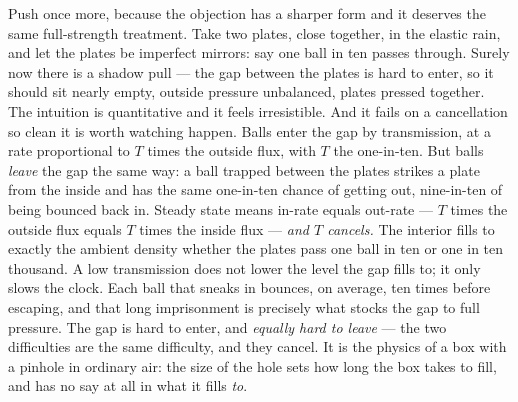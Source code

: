 \documentclass[fontsize=11pt,paper=a4,pagesize=auto,parskip=half-]{scrbook}
\begin{document}
Push once more, because the objection has a sharper form and it deserves the same full-strength treatment. Take two plates, close together, in the elastic rain, and let the plates be imperfect mirrors: say one ball in ten passes through. Surely now there is a shadow pull --- the gap between the plates is hard to enter, so it should sit nearly empty, outside pressure unbalanced, plates pressed together. The intuition is quantitative and it feels irresistible. And it fails on a cancellation so clean it is worth watching happen. Balls enter the gap by transmission, at a rate proportional to $T$ times the outside flux, with $T$ the one-in-ten. But balls \emph{leave} the gap the same way: a ball trapped between the plates strikes a plate from the inside and has the same one-in-ten chance of getting out, nine-in-ten of being bounced back in. Steady state means in-rate equals out-rate --- $T$ times the outside flux equals $T$ times the inside flux --- \emph{and $T$ cancels.} The interior fills to exactly the ambient density whether the plates pass one ball in ten or one in ten thousand. A low transmission does not lower the level the gap fills to; it only slows the clock. Each ball that sneaks in bounces, on average, ten times before escaping, and that long imprisonment is precisely what stocks the gap to full pressure. The gap is hard to enter, and \emph{equally hard to leave} --- the two difficulties are the same difficulty, and they cancel. It is the physics of a box with a pinhole in ordinary air: the size of the hole sets how long the box takes to fill, and has no say at all in what it fills \emph{to}.
\end{document}
